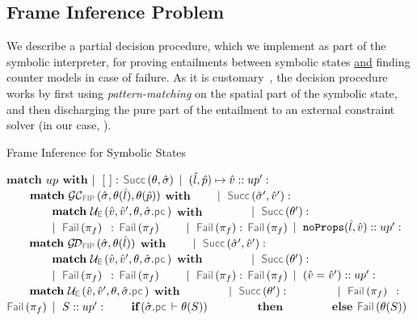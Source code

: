 \subsection{Frame Inference Problem}\label{subsec:fip}

We describe a partial decision procedure, which we  
implement as part of the \jsil symbolic interpreter, for proving entailments 
between symbolic states \underline{and} finding counter 
models in case of failure.  
As it is customary~\cite{javert,jacobs2011verifast,sepwithsmt}, the decision procedure works by first using \emph{pattern-matching} 
on the spatial part of the symbolic state, and then discharging the pure part of the 
entailment to an external constraint solver (in our case, \rosette). 

{\small \begin{algorithm}
\caption{Frame Inference for Symbolic States}\label{fip:symb:states}
\begin{algorithmic}[1]
    \State $\textbf{match}$ $up$ $\textbf{with}$
    \State $\mid~[ \ ]:$ \Return $\success{\subst, \sstate}$
    \State $\mid~(\hat{l}, \hat{p}) \mapsto \hat{v} :: up' :$ 
    \State $\qquad \textbf{match} \ \GetCellV{\sstate, \subst(\sloc), \subst(\sexprp)}$ $\textbf{with}$
    \State $\qquad \mid~\success{\sstate', \sexprv'}:$
    \State $\qquad \qquad \textbf{match} \ \unifylexpr(\sexprv, \sexprv', \subst, \sstate.\pcsel)$ $\textbf{with}$
     \State $\qquad \qquad \mid~ \success{\subst'}:$ \Return {}
      \State $\qquad \qquad \mid~ \fail{\pc_f} \ \, :$ \Return $\fail{\pc_f}$
      \State $\qquad \mid~\fail{\pc_f}:$ \Return $\fail{\pc_f}$
     \State $\mid~\texttt{noProps}(\hat{l}, \hat{v}) :: up' :$  
       \State $\qquad \textbf{match} \ \GetDomainV{\sstate, \subst(\sloc)}$ $\textbf{with}$
       \State $\qquad \mid~\success{\sstate', \sexprv'}:$
         \State $\qquad \qquad \textbf{match} \ \unifylexpr(\sexprv, \sexprv', \subst, \sstate.\pcsel)$ $\textbf{with}$
       \State $\qquad \qquad \mid~ \success{\subst'}:$ \Return {}
       \State $\qquad \qquad \mid~ \fail{\pc_f} \ \, :$ \Return $\fail{\pc_f}$
       \State $\qquad \mid~\fail{\pc_f}:$ \Return $\fail{\pc_f}$
     \State $\mid~(\hat{v} = \hat{v}') :: up' :$  
        \State $\qquad \textbf{match} \ \unifylexpr(\sexprv, \sexprv', \subst, \sstate.\pcsel)$ $\textbf{with}$
         \State $\qquad \qquad \mid~ \success{\subst'}:$ \Return {}
       \State $\qquad \qquad \mid~ \fail{\pc_f} \ \, :$ \Return $\fail{\pc_f}$
     \State $\mid~S :: up' :$   
      \State $\qquad \textbf{if} \,(\sstate.\pcsel \vdash \subst(\sass))$
       \State $\qquad \qquad \textbf{then}$ \Return  {}
      \State $\qquad \qquad \textbf{else}$  \Return $\fail{\subst(\sass)}$
\EndFunction
\end{algorithmic}
\end{algorithm}}

